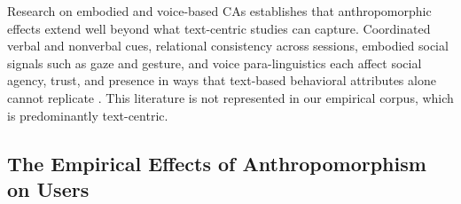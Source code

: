 \documentclass[preprint,review,12pt,authoryear,nonatbib]{elsarticle}
\begin{document}

Research on embodied and voice-based CAs establishes that anthropomorphic effects extend well beyond what text-centric studies can capture. Coordinated verbal and nonverbal cues, relational consistency across sessions, embodied social signals such as gaze and gesture, and voice para-linguistics each affect social agency, trust, and presence in ways that text-based behavioral attributes alone cannot replicate \parencite{cassell2000embodied,bickmore2005relational,kramer2003socially,clark2019makes}. This literature is not represented in our empirical corpus, which is predominantly text-centric. 





\subsection{The Empirical Effects of Anthropomorphism on Users}

\end{document}
